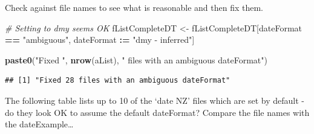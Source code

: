 \documentclass[]{article}
\newenvironment{Shaded}{\begin{snugshade}}{\end{snugshade}}
\newcommand{\KeywordTok}[1]{\textcolor[rgb]{0.13,0.29,0.53}{\textbf{#1}}}
\newcommand{\DataTypeTok}[1]{\textcolor[rgb]{0.13,0.29,0.53}{#1}}
\newcommand{\StringTok}[1]{\textcolor[rgb]{0.31,0.60,0.02}{#1}}
\newcommand{\CommentTok}[1]{\textcolor[rgb]{0.56,0.35,0.01}{\textit{#1}}}
\newcommand{\OperatorTok}[1]{\textcolor[rgb]{0.81,0.36,0.00}{\textbf{#1}}}
\newcommand{\ErrorTok}[1]{\textcolor[rgb]{0.64,0.00,0.00}{\textbf{#1}}}
\newcommand{\NormalTok}[1]{#1}
\begin{document}
Check against file names to see what is reasonable and then fix them.

\begin{Shaded}
\begin{Highlighting}[]
\CommentTok{# Setting to dmy seems OK}
\NormalTok{fListCompleteDT <-}\StringTok{ }\NormalTok{fListCompleteDT[dateFormat }\OperatorTok{==}\StringTok{ "ambiguous"}\NormalTok{, }
\NormalTok{                                   dateFormat }\OperatorTok{:}\ErrorTok{=}\StringTok{ "dmy - inferred"}\NormalTok{]}

\KeywordTok{paste0}\NormalTok{(}\StringTok{"Fixed "}\NormalTok{, }\KeywordTok{nrow}\NormalTok{(aList), }\StringTok{" files with an ambiguous dateFormat"}\NormalTok{)}
\end{Highlighting}
\end{Shaded}

\begin{verbatim}
## [1] "Fixed 28 files with an ambiguous dateFormat"
\end{verbatim}

The following table lists up to 10 of the `date NZ' files which are set
by default - do they look OK to assume the default dateFormat? Compare
the file names with the dateExample\ldots{}

\begin{Shaded}
\end{Shaded}
\end{document}
